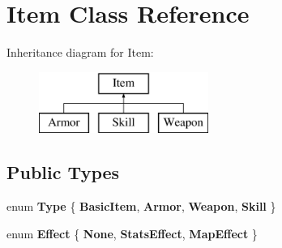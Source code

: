 \hypertarget{classItem}{\section{Item Class Reference}
\label{classItem}
}
Inheritance diagram for Item\-:\begin{figure}[H]
\begin{center}
\leavevmode
\includegraphics[height=2.000000cm]{classItem}
\end{center}
\end{figure}
\subsection*{Public Types}
\begin{DoxyCompactItemize}
\item 
enum {\bfseries Type} \{ {\bfseries Basic\-Item}, 
{\bfseries Armor}, 
{\bfseries Weapon}, 
{\bfseries Skill}
 \}
\item 
enum {\bfseries Effect} \{ {\bfseries None}, 
{\bfseries Stats\-Effect}, 
{\bfseries Map\-Effect}
 \}
\end{DoxyCompactItemize}

